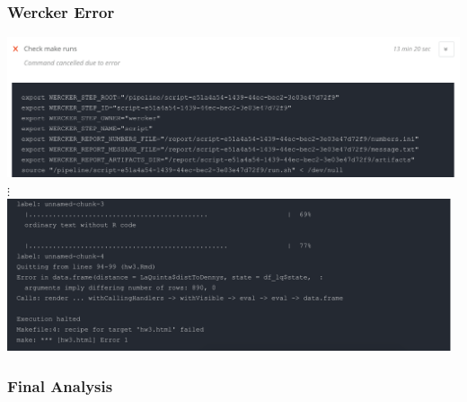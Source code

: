 \documentclass[12pt]{beamer}
\begin{document}

\begin{frame}
\frametitle{Wercker Error}
\begin{center}
\includegraphics[width=\textwidth]{imgs/wercker_error1.png} \\
$\vdots$ \\
\vspace{1mm}
\includegraphics[width=0.98\textwidth]{imgs/wercker_error2.png}
\end{center}
\end{frame}


\begin{frame}[t]
\frametitle{Final Analysis}

\vspace{-2mm}


\end{frame}
\end{document}
